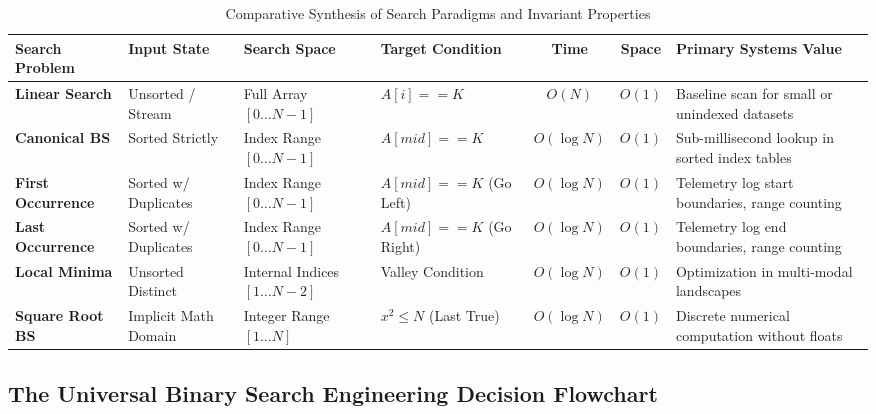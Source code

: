 \documentclass[10pt,journal,compsoc,onecolumn]{IEEEtran}
\begin{document}
\begin{table}[t]
\centering
\caption{Comparative Synthesis of Search Paradigms and Invariant Properties}
\label{tab:comparison}
\begin{tabular}{@{}p{1.9cm}p{2.1cm}p{2.3cm}p{2.1cm}ccp{3.6cm}@{}}
\toprule
\textbf{Search Problem} & \textbf{Input State} & \textbf{Search Space} & \textbf{Target Condition} & \textbf{Time} & \textbf{Space} & \textbf{Primary Systems Value} \\ \midrule
\textbf{Linear Search} & Unsorted / Stream & Full Array $[0 \dots N-1]$ & $A[i] == K$ & $O(N)$ & $O(1)$ & Baseline scan for small or unindexed datasets \\
\textbf{Canonical BS} & Sorted Strictly & Index Range $[0 \dots N-1]$ & $A[mid] == K$ & $O(\log N)$ & $O(1)$ & Sub-millisecond lookup in sorted index tables \\
\textbf{First Occurrence} & Sorted w/ Duplicates & Index Range $[0 \dots N-1]$ & $A[mid] == K$ (Go Left) & $O(\log N)$ & $O(1)$ & Telemetry log start boundaries, range counting \\
\textbf{Last Occurrence} & Sorted w/ Duplicates & Index Range $[0 \dots N-1]$ & $A[mid] == K$ (Go Right) & $O(\log N)$ & $O(1)$ & Telemetry log end boundaries, range counting \\
\textbf{Local Minima} & Unsorted Distinct & Internal Indices $[1 \dots N-2]$ & Valley Condition & $O(\log N)$ & $O(1)$ & Optimization in multi-modal landscapes \\
\textbf{Square Root BS} & Implicit Math Domain & Integer Range $[1 \dots N]$ & $x^2 \le N$ (Last True) & $O(\log N)$ & $O(1)$ & Discrete numerical computation without floats \\ \bottomrule
\end{tabular}
\end{table}

\subsection{The Universal Binary Search Engineering Decision Flowchart}
\end{document}
